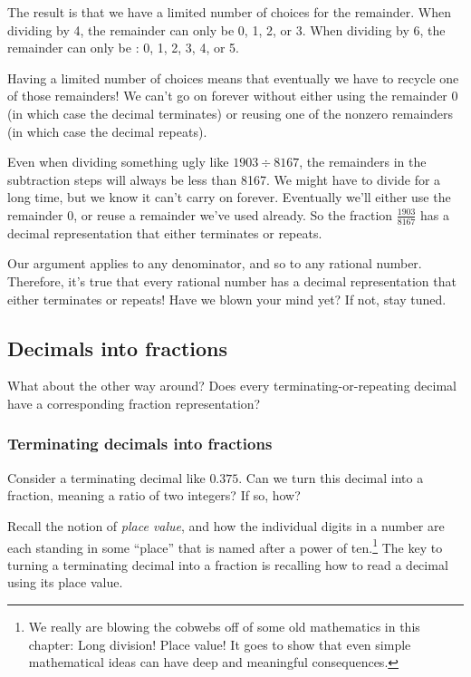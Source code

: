 The result is that we have a limited number of choices for the remainder. When dividing by 4, the remainder can only be 0, 1, 2, or 3. When dividing by 6, the remainder can only be : 0, 1, 2, 3, 4, or 5.

Having a limited number of choices means that eventually we have to recycle one of those remainders! We can't go on forever without either using the remainder 0 (in which case the decimal terminates) or reusing one of the nonzero remainders (in which case the decimal repeats).

Even when dividing something ugly like $1903 \div 8167$, the remainders in the subtraction steps will always be less than 8167. We might have to divide for a long time, but we know it can't carry on forever. Eventually we'll either use the remainder 0, or reuse a remainder we've used already. So the fraction $\frac{1903}{8167}$ has a decimal representation that either terminates or repeats.

Our argument applies to any denominator, and so to any rational number. Therefore, it's true that every rational number has a decimal representation that either terminates or repeats! Have we blown your mind yet? If not, stay tuned.

\subsection{Decimals into fractions}

What about the other way around? Does every terminating-or-repeating decimal have a corresponding fraction representation?

\subsubsection{Terminating decimals into fractions}

Consider a terminating decimal like $0.375$. Can we turn this decimal into a fraction, meaning a ratio of two integers? If so, how?

Recall the notion of \textit{place value}, and how the individual digits in a number are each standing in some ``place'' that is named after a power of ten.\footnote{We really are blowing the cobwebs off of some old mathematics in this chapter: Long division! Place value! It goes to show that even simple mathematical ideas can have deep and meaningful consequences.} The key to turning a terminating decimal into a fraction is recalling how to read a decimal using its place value.

